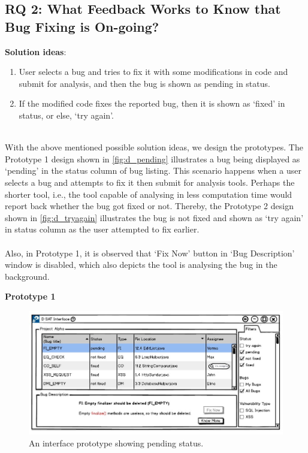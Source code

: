\subsection{RQ 2: What Feedback Works to Know that Bug Fixing is On-going?}
\hfill \break
\textbf{Solution ideas}: \\
\begin{enumerate}
\item  User selects a bug and tries to fix it with some modifications in code and submit for analysis, and then the bug is shown as pending in status.
\item  If the modified code fixes the reported bug, then it is shown as ‘fixed’ in status, or else, ‘try again’. \\ \\
\end{enumerate}

With the above mentioned possible solution ideas, we design the prototypes. The Prototype 1 design shown in \autoref{fig:d_pending} illustrates a bug being displayed as ‘pending’ in the status column of bug listing. This scenario happens when a user selects a bug and attempts to fix it then submit for analysis tools. Perhaps the shorter tool, i.e., the tool capable of analysing in less computation time would report back whether the bug got fixed or not. Thereby, the Prototype 2 design shown in \autoref{fig:d_tryagain} illustrates the bug is not fixed and shown as ‘try again’ in status column as the user attempted to fix earlier. \\ \\

Also, in Prototype 1, it is observed that ‘Fix Now’ button in ‘Bug Description’ window is disabled, which also depicts the tool is analysing the bug in the background. \\

\clearpage 

\textbf{Prototype 1}
\\
\begin{figure}[hbt!]
	\centering
	\includegraphics[width=\linewidth]{figures/d_pending}
	\caption{An interface prototype showing pending status.}
	\label{fig:d_pending}
\end{figure}

